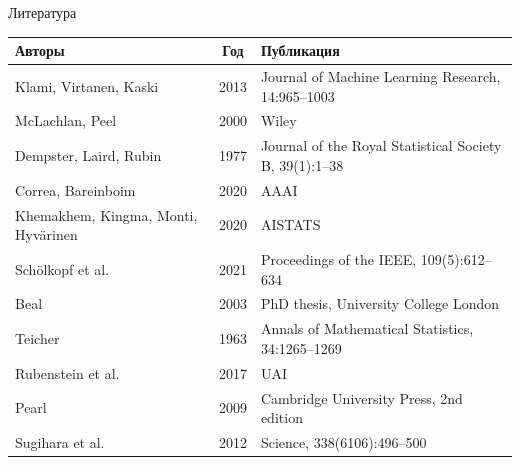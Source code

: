 \documentclass[19pt,pdf,hyperref={unicode}]{beamer}
\begin{document}
\begin{frame}{Литература}
\tiny
\begin{tabularx}{\textwidth}{l c X}
\toprule
\textbf{Авторы} & \textbf{Год} & \textbf{Публикация} \\
\midrule
Klami, Virtanen, Kaski & 2013 & Journal of Machine Learning Research, 14:965--1003 \\
McLachlan, Peel & 2000 & Wiley \\
Dempster, Laird, Rubin & 1977 & Journal of the Royal Statistical Society B, 39(1):1--38 \\
Correa, Bareinboim & 2020 & AAAI \\
Khemakhem, Kingma, Monti, Hyv\"arinen & 2020 & AISTATS \\
Sch\"olkopf et al. & 2021 & Proceedings of the IEEE, 109(5):612--634 \\
Beal & 2003 & PhD thesis, University College London \\
Teicher & 1963 & Annals of Mathematical Statistics, 34:1265--1269 \\
Rubenstein et al. & 2017 & UAI \\
Pearl & 2009 & Cambridge University Press, 2nd edition \\
Sugihara et al. & 2012 & Science, 338(6106):496--500 \\
\bottomrule
\end{tabularx}
\end{frame}
\end{document}
